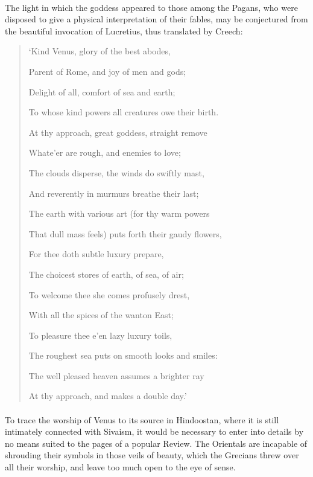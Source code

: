 \documentclass[a4paper, 11pt, oneside, polutonikogreek, english]{article}
\begin{document}
\paragraph{}
The light in which the goddess appeared to those among the Pagans, who were disposed to give a physical interpretation of their fables, may be conjectured from the beautiful invocation of Lucretius, thus translated by Creech:
\begin{quotation}
`Kind Venus, glory of the best abodes,

Parent of Rome, and joy of men and gods;

Delight of all, comfort of sea and earth;

To whose kind powers all creatures owe their birth.

At thy approach, great goddess, straight remove

Whate'er are rough, and enemies to love;

The clouds disperse, the winds do swiftly mast,

And reverently in murmurs breathe their last;

The earth with various art (for thy warm powers

That dull mass feels) puts forth their gaudy flowers,

For thee doth subtle luxury prepare,

The choicest stores of earth, of sea, of air;

To welcome thee she comes profusely drest,

With all the spices of the wanton East;

To pleasure thee e'en lazy luxury toils,

The roughest sea puts on smooth looks and smiles:

The well pleased heaven assumes a brighter ray

At thy approach, and makes a double day.'
\end{quotation}
\paragraph{}
To trace the worship of Venus to its source in Hindoostan, where it is still intimately connected with Sivaism, it would be necessary to enter into details by no means suited to the pages of a popular Review. The Orientals are incapable of shrouding their symbols in those veils of beauty, which the Grecians threw over all their worship, and leave too much open to the eye of sense.
\end{document}
